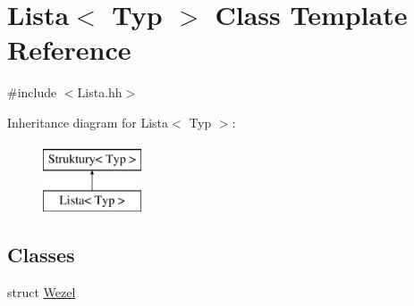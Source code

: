 \hypertarget{class_lista}{\section{Lista$<$ Typ $>$ Class Template Reference}
\label{class_lista}
}


{\ttfamily \#include $<$Lista.\-hh$>$}

Inheritance diagram for Lista$<$ Typ $>$\-:\begin{figure}[H]
\begin{center}
\leavevmode
\includegraphics[height=2.000000cm]{class_lista}
\end{center}
\end{figure}
\subsection*{Classes}
\begin{DoxyCompactItemize}
\item 
struct \hyperlink{struct_lista_1_1_wezel}{Wezel}
\end{DoxyCompactItemize}
